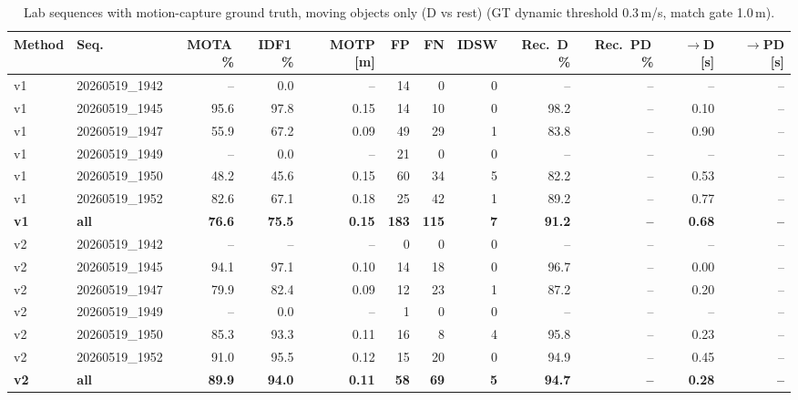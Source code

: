 \begin{table}[t]
\centering
\caption{Lab sequences with motion-capture ground truth, moving objects only (D vs rest) (GT dynamic threshold 0.3\,m/s, match gate 1.0\,m).}
\label{tab:own_r7_dynamic_only}
\setlength{\tabcolsep}{3pt}
\begin{tabular}{llrrrrrrrrrr}
\toprule
Method & Seq. & MOTA\,\% & IDF1\,\% & MOTP [m] & FP & FN & IDSW & Rec.\ D\,\% & Rec.\ PD\,\% & $\to$D [s] & $\to$PD [s] \\
\midrule
v1 & 20260519\_1942 & -- & 0.0 & -- & 14 & 0 & 0 & -- & -- & -- & -- \\
v1 & 20260519\_1945 & 95.6 & 97.8 & 0.15 & 14 & 10 & 0 & 98.2 & -- & 0.10 & -- \\
v1 & 20260519\_1947 & 55.9 & 67.2 & 0.09 & 49 & 29 & 1 & 83.8 & -- & 0.90 & -- \\
v1 & 20260519\_1949 & -- & 0.0 & -- & 21 & 0 & 0 & -- & -- & -- & -- \\
v1 & 20260519\_1950 & 48.2 & 45.6 & 0.15 & 60 & 34 & 5 & 82.2 & -- & 0.53 & -- \\
v1 & 20260519\_1952 & 82.6 & 67.1 & 0.18 & 25 & 42 & 1 & 89.2 & -- & 0.77 & -- \\
\textbf{v1} & \textbf{all} & \textbf{76.6} & \textbf{75.5} & \textbf{0.15} & \textbf{183} & \textbf{115} & \textbf{7} & \textbf{91.2} & \textbf{--} & \textbf{0.68} & \textbf{--} \\
\midrule
v2 & 20260519\_1942 & -- & -- & -- & 0 & 0 & 0 & -- & -- & -- & -- \\
v2 & 20260519\_1945 & 94.1 & 97.1 & 0.10 & 14 & 18 & 0 & 96.7 & -- & 0.00 & -- \\
v2 & 20260519\_1947 & 79.9 & 82.4 & 0.09 & 12 & 23 & 1 & 87.2 & -- & 0.20 & -- \\
v2 & 20260519\_1949 & -- & 0.0 & -- & 1 & 0 & 0 & -- & -- & -- & -- \\
v2 & 20260519\_1950 & 85.3 & 93.3 & 0.11 & 16 & 8 & 4 & 95.8 & -- & 0.23 & -- \\
v2 & 20260519\_1952 & 91.0 & 95.5 & 0.12 & 15 & 20 & 0 & 94.9 & -- & 0.45 & -- \\
\textbf{v2} & \textbf{all} & \textbf{89.9} & \textbf{94.0} & \textbf{0.11} & \textbf{58} & \textbf{69} & \textbf{5} & \textbf{94.7} & \textbf{--} & \textbf{0.28} & \textbf{--} \\
\bottomrule
\end{tabular}
\end{table}

